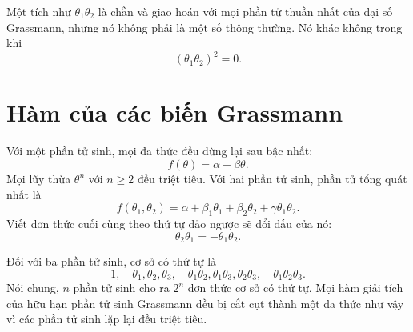 Một tích như \(\theta_1\theta_2\) là chẵn và giao hoán với mọi phần tử thuần nhất của đại số Grassmann, nhưng nó không phải là một số thông thường. Nó khác không trong khi
\begin{equation}
(\theta_1\theta_2)^2=0.
\end{equation}

\begin{classroomqa}
\end{classroomqa}

\section{Hàm của các biến Grassmann}

Với một phần tử sinh, mọi đa thức đều dừng lại sau bậc nhất:
\begin{equation}
f(\theta)=\alpha+\beta\theta.
\end{equation}
Mọi lũy thừa \(\theta^n\) với \(n\geq2\) đều triệt tiêu. Với hai phần tử sinh, phần tử tổng quát nhất là
\begin{equation}
f(\theta_1,\theta_2)
=\alpha+\beta_1\theta_1+\beta_2\theta_2
+\gamma\theta_1\theta_2.
\end{equation}
Viết đơn thức cuối cùng theo thứ tự đảo ngược sẽ đổi dấu của nó:
\begin{equation}
\theta_2\theta_1=-\theta_1\theta_2.
\end{equation}

\begin{classroomqa}
\end{classroomqa}

Đối với ba phần tử sinh, cơ sở có thứ tự là
\begin{equation}
1,\quad
\theta_1,\theta_2,\theta_3,\quad
\theta_1\theta_2,\theta_1\theta_3,\theta_2\theta_3,\quad
\theta_1\theta_2\theta_3.
\end{equation}
Nói chung, \(n\) phần tử sinh cho ra \(2^n\) đơn thức cơ sở có thứ tự. Mọi hàm giải tích của hữu hạn phần tử sinh Grassmann đều bị cắt cụt thành một đa thức như vậy vì các phần tử sinh lặp lại đều triệt tiêu. 

